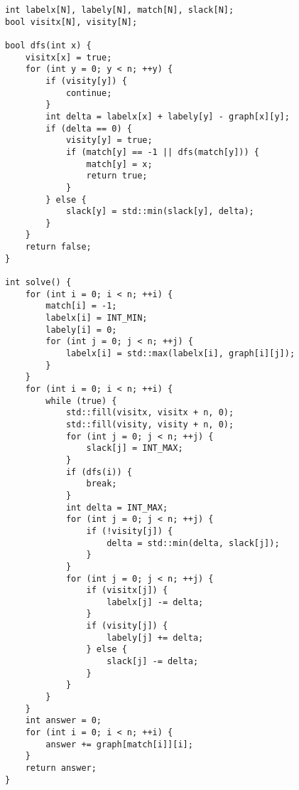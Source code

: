 \begin{lstlisting}
int labelx[N], labely[N], match[N], slack[N];
bool visitx[N], visity[N];

bool dfs(int x) {
    visitx[x] = true;
    for (int y = 0; y < n; ++y) {
        if (visity[y]) {
            continue;
        }
        int delta = labelx[x] + labely[y] - graph[x][y];
        if (delta == 0) {
            visity[y] = true;
            if (match[y] == -1 || dfs(match[y])) {
                match[y] = x;
                return true;
            }
        } else {
            slack[y] = std::min(slack[y], delta);
        }
    }
    return false;
}

int solve() {
    for (int i = 0; i < n; ++i) {
        match[i] = -1;
        labelx[i] = INT_MIN;
        labely[i] = 0;
        for (int j = 0; j < n; ++j) {
            labelx[i] = std::max(labelx[i], graph[i][j]);
        }
    }
    for (int i = 0; i < n; ++i) {
        while (true) {
            std::fill(visitx, visitx + n, 0);
            std::fill(visity, visity + n, 0);
            for (int j = 0; j < n; ++j) {
                slack[j] = INT_MAX;
            }
            if (dfs(i)) {
                break;
            }
            int delta = INT_MAX;
            for (int j = 0; j < n; ++j) {
                if (!visity[j]) {
                    delta = std::min(delta, slack[j]);
                }
            }
            for (int j = 0; j < n; ++j) {
                if (visitx[j]) {
                    labelx[j] -= delta;
                }
                if (visity[j]) {
                    labely[j] += delta;
                } else {
                    slack[j] -= delta;
                }
            }
        }
    }
    int answer = 0;
    for (int i = 0; i < n; ++i) {
        answer += graph[match[i]][i];
    }
    return answer;
}
\end{lstlisting}
